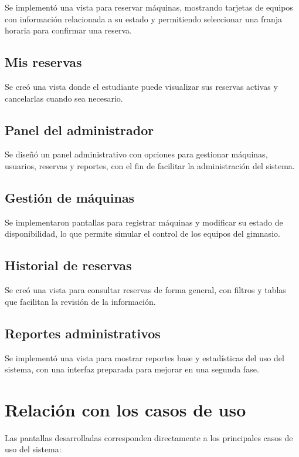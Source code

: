 \documentclass[12pt]{article}
\begin{document}
Se implementó una vista para reservar máquinas, mostrando tarjetas de equipos con información relacionada a su estado y permitiendo seleccionar una franja horaria para confirmar una reserva.

\subsection{Mis reservas}

Se creó una vista donde el estudiante puede visualizar sus reservas activas y cancelarlas cuando sea necesario.

\subsection{Panel del administrador}

Se diseñó un panel administrativo con opciones para gestionar máquinas, usuarios, reservas y reportes, con el fin de facilitar la administración del sistema.

\subsection{Gestión de máquinas}

Se implementaron pantallas para registrar máquinas y modificar su estado de disponibilidad, lo que permite simular el control de los equipos del gimnasio.

\subsection{Historial de reservas}

Se creó una vista para consultar reservas de forma general, con filtros y tablas que facilitan la revisión de la información.

\subsection{Reportes administrativos}

Se implementó una vista para mostrar reportes base y estadísticas del uso del sistema, con una interfaz preparada para mejorar en una segunda fase.

\section{Relación con los casos de uso}

Las pantallas desarrolladas corresponden directamente a los principales casos de uso del sistema:
\end{document}
